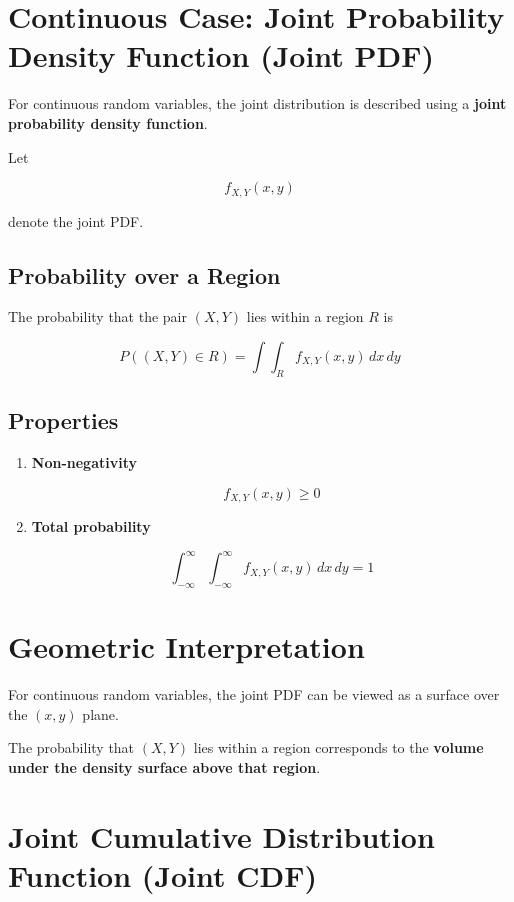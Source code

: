 \documentclass[12pt]{article}
\begin{document}
\section{Continuous Case: Joint Probability Density Function (Joint PDF)}

For continuous random variables, the joint distribution is described using a \textbf{joint probability density function}.

Let

\[
f_{X,Y}(x,y)
\]

denote the joint PDF.

\subsection*{Probability over a Region}

The probability that the pair $(X,Y)$ lies within a region $R$ is

\[
P((X,Y) \in R) =
\int\int_R f_{X,Y}(x,y)\,dx\,dy
\]

\subsection*{Properties}

\begin{enumerate}
\item \textbf{Non-negativity}

\[
f_{X,Y}(x,y) \ge 0
\]

\item \textbf{Total probability}

\[
\int_{-\infty}^{\infty}\int_{-\infty}^{\infty} f_{X,Y}(x,y)\,dx\,dy = 1
\]

\end{enumerate}

\section{Geometric Interpretation}

For continuous random variables, the joint PDF can be viewed as a surface over the $(x,y)$ plane.

The probability that $(X,Y)$ lies within a region corresponds to the \textbf{volume under the density surface above that region}.

\section{Joint Cumulative Distribution Function (Joint CDF)}
\end{document}
